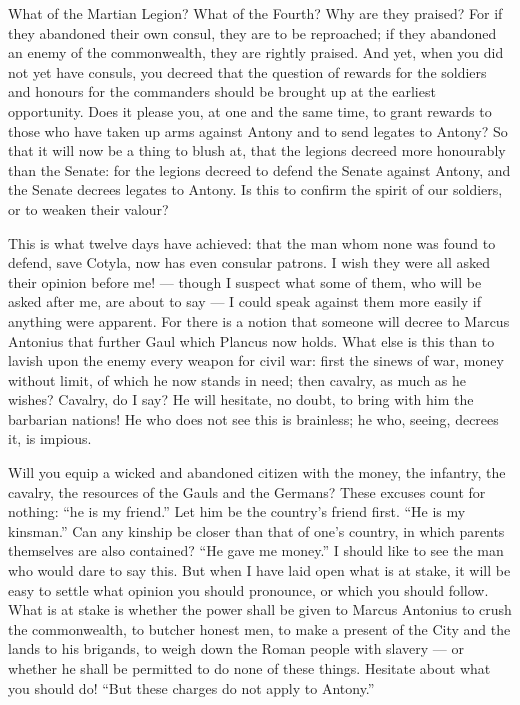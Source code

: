  What of the Martian Legion? What of the Fourth? Why are they praised? For if they abandoned their own consul, they are to be reproached; if they abandoned an enemy of the commonwealth, they are rightly praised. And yet, when you did not yet have consuls, you decreed that the question of rewards for the soldiers and honours for the commanders should be brought up at the earliest opportunity. Does it please you, at one and the same time, to grant rewards to those who have taken up arms against Antony and to send legates to Antony? So that it will now be a thing to blush at, that the legions decreed more honourably than the Senate: for the legions decreed to defend the Senate against Antony, and the Senate decrees legates to Antony. Is this to confirm the spirit of our soldiers, or to weaken their valour?

 This is what twelve days have achieved: that the man whom none was found to defend, save Cotyla, now has even consular patrons. I wish they were all asked their opinion before me! --- though I suspect what some of them, who will be asked after me, are about to say --- I could speak against them more easily if anything were apparent. For there is a notion that someone will decree to Marcus Antonius that further Gaul which Plancus now holds. What else is this than to lavish upon the enemy every weapon for civil war: first the sinews of war, money without limit, of which he now stands in need; then cavalry, as much as he wishes? Cavalry, do I say? He will hesitate, no doubt, to bring with him the barbarian nations! He who does not see this is brainless; he who, seeing, decrees it, is impious.

 Will you equip a wicked and abandoned citizen with the money, the infantry, the cavalry, the resources of the Gauls and the Germans? These excuses count for nothing: ``he is my friend.'' Let him be the country's friend first. ``He is my kinsman.'' Can any kinship be closer than that of one's country, in which parents themselves are also contained? ``He gave me money.'' I should like to see the man who would dare to say this. But when I have laid open what is at stake, it will be easy to settle what opinion you should pronounce, or which you should follow. What is at stake is whether the power shall be given to Marcus Antonius to crush the commonwealth, to butcher honest men, to make a present of the City and the lands to his brigands, to weigh down the Roman people with slavery --- or whether he shall be permitted to do none of these things. Hesitate about what you should do! ``But these charges do not apply to Antony.''

